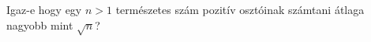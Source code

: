    Igaz-e hogy egy $n>1$ természetes szám pozitív osztóinak számtani átlaga 
   nagyobb mint $\sqrt{n}$?
